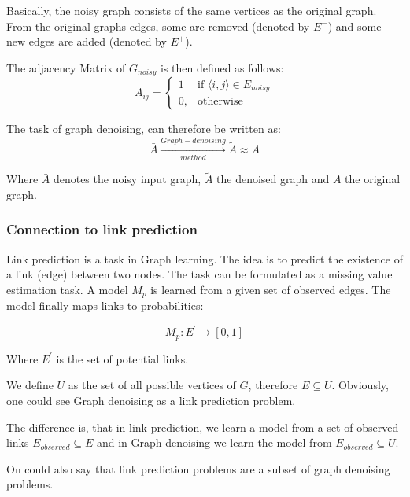 Basically, the noisy graph consists of the same vertices as the original graph. From
the original graphs edges, some are removed (denoted by $E^{-}$) and some new edges are added
(denoted by $E^{+}$).

The adjacency Matrix of $G_{noisy}$ is then defined as follows:
\begin{equation}
    \bar{A}_{ij} =    
    \begin{cases}
        1  & \text{if } \langle i,j \rangle \in E_{noisy} \\
        0, & \text{otherwise}
    \end{cases}
\end{equation}

The task of graph denoising, can therefore be written as:
\begin{equation}
    \bar{A} \xrightarrow[method]{Graph-denoising} \tilde{A} \approx A
\end{equation}

Where $\bar{A}$ denotes the noisy input graph, $\tilde{A}$ the denoised
 graph and $A$ the original graph.


\subsubsection{Connection to link prediction}
Link prediction is a task in Graph learning. 
The idea is to predict the existence of a link (edge) between two nodes.
The task can be formulated as a missing value estimation task. A model $M_p$ is learned
from a given set of observed edges. The model finally maps links to probabilities:


\begin{equation}
    M_p : E^{\prime} \rightarrow [0,1]
\end{equation}

Where $E^{\prime}$ is the set of potential links.


We define $U$ as the set of all possible vertices of $G$, therefore $E \subseteq U$.
Obviously, one could see Graph denoising as a link prediction problem.

The difference is, that in link prediction, we learn a model from a set of observed links 
$E_{observed} \subseteq E$ and in Graph denoising we learn the model from 
$E_{observed} \subseteq U$. 

On could also say that link prediction problems are a subset of graph denoising problems.



